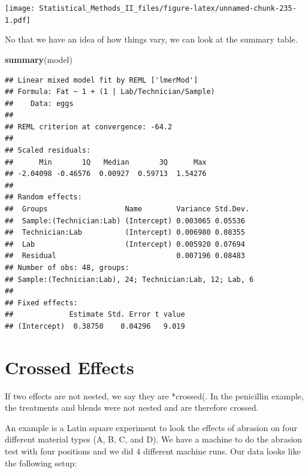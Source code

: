 \documentclass[]{book}
\newenvironment{Shaded}{\begin{snugshade}}{\end{snugshade}}
\newcommand{\KeywordTok}[1]{\textcolor[rgb]{0.13,0.29,0.53}{\textbf{{#1}}}}
\newcommand{\NormalTok}[1]{{#1}}
\theoremstyle{definition}
\theoremstyle{definition}
\theoremstyle{remark}
\begin{document}
\texttt{[image: Statistical\_Methods\_II\_files/figure-latex/unnamed-chunk-235-1.pdf]}

No that we have an idea of how things vary, we can look at the summary
table.

\begin{Shaded}
\begin{Highlighting}[]
\KeywordTok{summary}\NormalTok{(model)}
\end{Highlighting}
\end{Shaded}

\begin{verbatim}
## Linear mixed model fit by REML ['lmerMod']
## Formula: Fat ~ 1 + (1 | Lab/Technician/Sample)
##    Data: eggs
## 
## REML criterion at convergence: -64.2
## 
## Scaled residuals: 
##      Min       1Q   Median       3Q      Max 
## -2.04098 -0.46576  0.00927  0.59713  1.54276 
## 
## Random effects:
##  Groups                  Name        Variance Std.Dev.
##  Sample:(Technician:Lab) (Intercept) 0.003065 0.05536 
##  Technician:Lab          (Intercept) 0.006980 0.08355 
##  Lab                     (Intercept) 0.005920 0.07694 
##  Residual                            0.007196 0.08483 
## Number of obs: 48, groups:  
## Sample:(Technician:Lab), 24; Technician:Lab, 12; Lab, 6
## 
## Fixed effects:
##             Estimate Std. Error t value
## (Intercept)  0.38750    0.04296   9.019
\end{verbatim}

\section{Crossed Effects}\label{crossed-effects}

If two effects are not nested, we say they are *crossed(. In the
penicillin example, the treatments and blends were not nested and are
therefore crossed.

An example is a Latin square experiment to look the effects of abrasion
on four different material types (A, B, C, and D). We have a machine to
do the abrasion test with four positions and we did 4 different machine
runs. Our data looks like the following setup:
\end{document}
